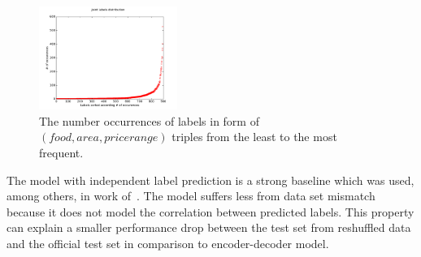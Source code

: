 \documentclass{itatnew}
\begin{document}
\begin{figure}
\vspace{-0.80em}
    \begin{center}
\includegraphics[width=0.4\textwidth]{jointLabelsDistrib}
    \end{center}
\vspace{-1.80em}
\caption{The number occurrences of labels in form of $(food, area, pricerange)$ triples from the least to the most frequent.}
\label{fig:labels}
\end{figure}

The model with independent label prediction is a strong baseline which was used, among others, in work of~\cite{zilka2015incremental}.
The model suffers less from data set mismatch because it does not model the correlation between predicted labels.
This property can explain a smaller performance drop between the test set from reshuffled data and the official test set in comparison to encoder-decoder model.
\end{document}
